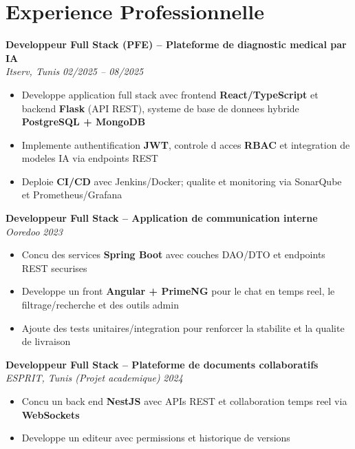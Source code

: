 \documentclass[10pt,a4paper]{article}
\begin{document}
\vspace{6pt}

\section*{Experience Professionnelle}
{\small

\textbf{Developpeur Full Stack (PFE) -- Plateforme de diagnostic medical par IA}\\[1pt]
\textit{Itserv, Tunis} \hfill \textit{02/2025 -- 08/2025}
\begin{itemize}
  \item Developpe application full stack avec frontend \textbf{React/TypeScript} et backend \textbf{Flask} (API REST), systeme de base de donnees hybride \textbf{PostgreSQL + MongoDB}
  \item Implemente authentification \textbf{JWT}, controle d acces \textbf{RBAC} et integration de modeles IA via endpoints REST
  \item Deploie \textbf{CI/CD} avec Jenkins/Docker; qualite et monitoring via SonarQube et Prometheus/Grafana
\end{itemize}

\vspace{3pt}
\textbf{Developpeur Full Stack -- Application de communication interne}\\[1pt]
\textit{Ooredoo} \hfill \textit{2023}
\begin{itemize}
  \item Concu des services \textbf{Spring Boot} avec couches DAO/DTO et endpoints REST securises
  \item Developpe un front \textbf{Angular + PrimeNG} pour le chat en temps reel, le filtrage/recherche et des outils admin
  \item Ajoute des tests unitaires/integration pour renforcer la stabilite et la qualite de livraison
\end{itemize}

\vspace{3pt}
\textbf{Developpeur Full Stack -- Plateforme de documents collaboratifs}\\[1pt]
\textit{ESPRIT, Tunis (Projet academique)} \hfill \textit{2024}
\begin{itemize}
  \item Concu un back end \textbf{NestJS} avec APIs REST et collaboration temps reel via \textbf{WebSockets}
  \item Developpe un editeur avec permissions et historique de versions
\end{itemize}

}
\end{document}
